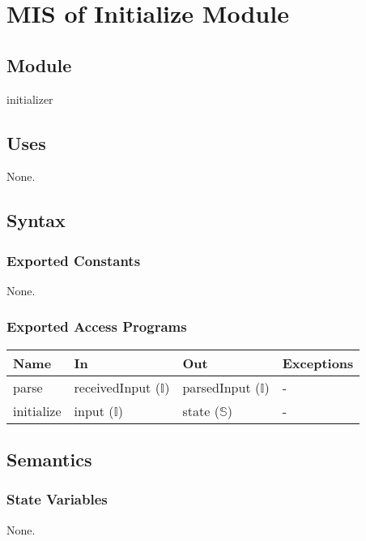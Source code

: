 \documentclass[12pt, titlepage]{article}
\begin{document}
\section{MIS of Initialize Module} \label{Module_initialize}
\subsection{Module}

initializer

\subsection{Uses}

None.

\subsection{Syntax}

\subsubsection{Exported Constants}
None.

\subsubsection{Exported Access Programs}

\begin{center}
\begin{tabular}{p{2cm} p{4cm} p{4cm} p{2cm}}
\hline
\textbf{Name} & \textbf{In} & \textbf{Out} & \textbf{Exceptions} \\
\hline
parse & receivedInput ($\mathbb{I}$) & parsedInput ($\mathbb{I}$) & - \\
initialize & input ($\mathbb{I}$) & state ($\mathbb{S}$) & - \\
\hline
\end{tabular}
\end{center}

\subsection{Semantics}

\subsubsection{State Variables}

None.
\end{document}
